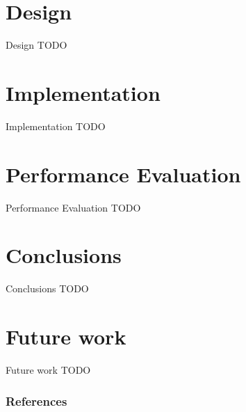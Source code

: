 \documentclass{beamer}
\begin{document}
	\section{Design}
	\begin{frame}{Design}
		TODO
	\end{frame}
	
	\section{Implementation}
	\begin{frame}{Implementation}
		TODO
	\end{frame}
	
	\section{Performance Evaluation}
	\begin{frame}{Performance Evaluation}
		TODO
	\end{frame}
	
	\section{Conclusions}
	\begin{frame}{Conclusions}
		TODO
	\end{frame}
	
	\section{Future work}
	\begin{frame}{Future work}
		TODO
	\end{frame}
	
	\begin{frame}[allowframebreaks]
		\frametitle{References}
		
		
	\end{frame}
	
\end{document}
